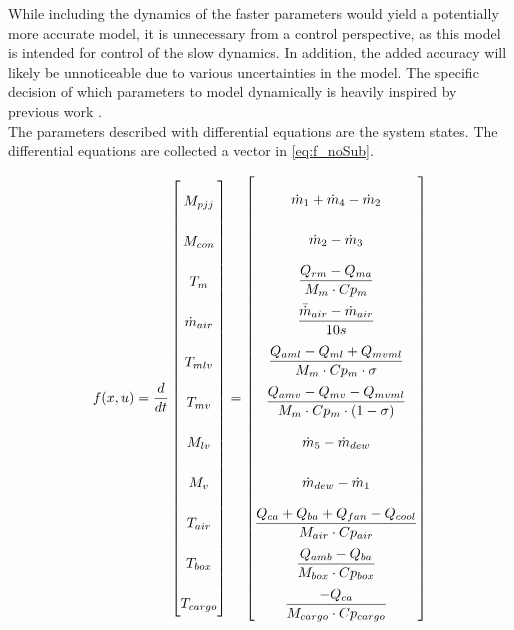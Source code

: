 While including the dynamics of the faster parameters would yield a potentially more accurate model, it is unnecessary from a control perspective, as this model is intended for control of the slow dynamics. In addition, the added accuracy will likely be unnoticeable due to various uncertainties in the model. The specific decision of which parameters to model dynamically is heavily inspired by previous work \cite{Sorensen2013}.\\
The parameters described with differential equations are the system states. The differential equations are collected a vector in \cref{eq:f_noSub}.



\begin{equation} \label{eq:f_noSub} \renewcommand{\arraystretch}{2.4}
	f(x,u) =  \dfrac{d}{dt} \begin{bmatrix}
		M_{pjj}			\\				%
		M_{con} 		\\				%
		T_m 			\\				%
		\dot{m}_{air}	\\				%
		T_{mlv}			\\				%
		T_{mv}			\\				%
		M_{lv}			\\				%
		M_v				\\				%
		T_{air}			\\				%
		T_{box}			\\				%
		T_{cargo}		\\				%

	\end{bmatrix}
	=
	\begin{bmatrix}
		\dot{m}_1 + \dot{m}_4 - \dot{m}_2 \\										%
		\dot{m}_{2} - \dot{m}_{3}	\\												%
		\dfrac{Q_{rm} - Q_{ma}}{M_m \cdot Cp_m} \\									%
		\dfrac{\bar{\dot{m}}_{air}  - \dot{m}_{air}} {10s}		\\					%
		\dfrac{Q_{aml}-Q_{ml} + Q_{mvml}}{M_m \cdot Cp_m \cdot \sigma}        \\	%
		\dfrac{Q_{amv} - Q_{mv} - Q_{mvml}}{M_m \cdot Cp_m \cdot (1- \sigma)}	\\	%
		\dot{m}_{5} - \dot{m}_{dew}		\\											%
		\dot{m}_{dew} - \dot{m}_{1}	\\												%
		\dfrac{Q_{ca} + Q_{ba} + Q_{fan} -Q_{cool}}{M_{air} \cdot Cp_{air}} \\		%
		\dfrac{Q_{amb} - Q_{ba}}{M_{box} \cdot Cp_{box}} \\							%
		\dfrac{-Q_{ca}}{M_{cargo} \cdot Cp_{cargo}}									%
	\end{bmatrix}
\end{equation}


